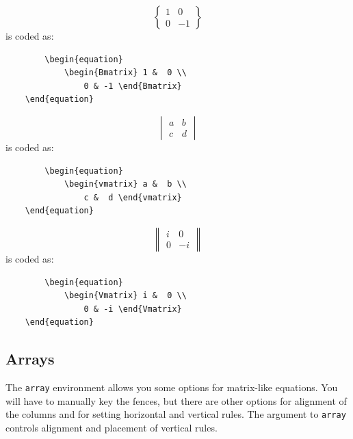 \documentclass[lettersize,journal]{IEEEtran}
\begin{document}
	\begin{equation}
		\begin{Bmatrix} 1 &  0 \\ 
			0 & -1 \end{Bmatrix}
	\end{equation}
	is coded as:
	\begin{verbatim}
		\begin{equation}
			\begin{Bmatrix} 1 &  0 \\ 
				0 & -1 \end{Bmatrix}
	\end{equation}\end{verbatim}
	
	\begin{equation}
		\begin{vmatrix} a &  b \\ 
			c &  d \end{vmatrix}
	\end{equation}
	is coded as:
	\begin{verbatim}
		\begin{equation}
			\begin{vmatrix} a &  b \\ 
				c &  d \end{vmatrix}
	\end{equation}\end{verbatim}
	
	\begin{equation}
		\begin{Vmatrix} i &  0 \\ 
			0 & -i \end{Vmatrix}
	\end{equation}
	is coded as:
	\begin{verbatim}
		\begin{equation}
			\begin{Vmatrix} i &  0 \\ 
				0 & -i \end{Vmatrix}
	\end{equation}\end{verbatim}
	
	\subsection{Arrays}
	The {\tt{array}} environment allows you some options for matrix-like equations. You will have to manually key the fences, but there are other options for alignment of the columns and for setting horizontal and vertical rules. The argument to {\tt{array}} controls alignment and placement of vertical rules.
	
\end{document}
